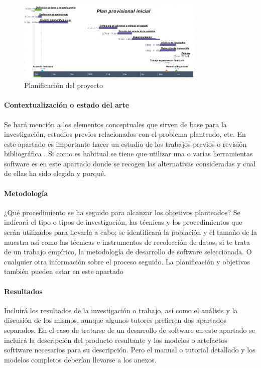 \begin{figure}  
 	\begin{center}
        \includegraphics[width=0.8\textwidth]{Figuras/plandef.png}
        	\end{center}
        \caption{Planificación del proyecto}
    \label{fig:plan}
\end{figure}

\paragraph{Contextualización o estado del arte}

Se hará mención a los elementos conceptuales que  sirven  de  base  para  la  investigación,  estudios  previos  relacionados  con  el problema planteado, etc. En este apartado es importante hacer un estudio de los trabajos previos o revisión bibliográfica \cite{kitchenham2009systematic,kitchenham_2013}. Si como es habitual se tiene  que utilizar una o varias herramientas software es en este apartado donde se recogen las alternativas consideradas y cual de ellas ha sido elegida  y porqué.

\paragraph{Metodología}
¿Qué procedimiento se ha seguido para alcanzar los objetivos
planteados? Se  indicará  el  tipo  o  tipos  de  investigación,  las  técnicas  y  los procedimientos  que  serán  utilizados  para  llevarla  a  cabo;  se  identificará la población  y  el  tamaño  de  la  muestra  así  como  las técnicas  e  instrumentos  de recolección de datos, si te trata de un trabajo empírico, la metodología de desarrollo de software seleccionada. O cualquier otra información sobre el proceso seguido. La planificación y objetivos también pueden estar en este apartado

 
\paragraph{Resultados}
Incluirá  los  resultados  de  la  investigación  o  trabajo,  así como el análisis y la discusión de los mismos, aunque algunos tutores prefieren dos apartados separados. En el caso de tratarse de un desarrollo de software en este apartado se incluirá la descripción del producto resultante y los modelos o artefactos softtware necesarios para su descripción. Pero el manual o tutorial detallado  y los modelos completos deberían llevarse a los anexos.


